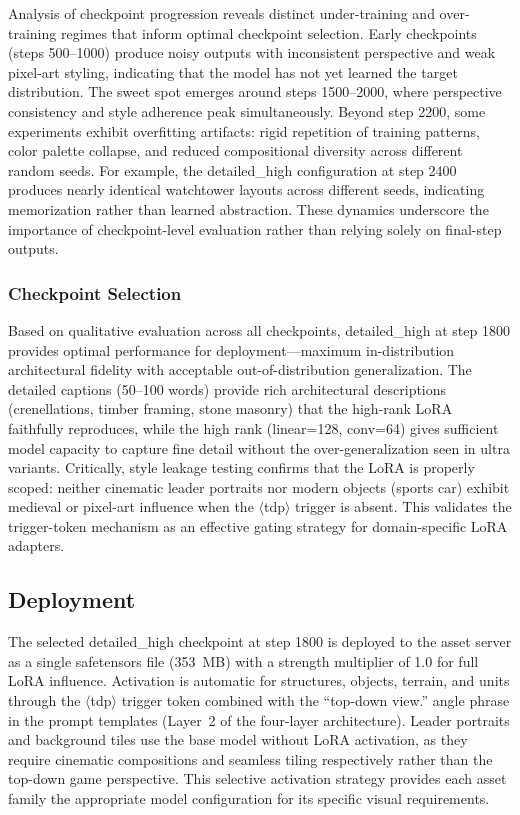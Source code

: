 \documentclass[conference]{IEEEtran}
\begin{document}
Analysis of checkpoint progression reveals distinct under-training and over-training regimes that inform optimal checkpoint selection. Early checkpoints (steps 500--1000) produce noisy outputs with inconsistent perspective and weak pixel-art styling, indicating that the model has not yet learned the target distribution. The sweet spot emerges around steps 1500--2000, where perspective consistency and style adherence peak simultaneously. Beyond step 2200, some experiments exhibit overfitting artifacts: rigid repetition of training patterns, color palette collapse, and reduced compositional diversity across different random seeds. For example, the detailed\_high configuration at step 2400 produces nearly identical watchtower layouts across different seeds, indicating memorization rather than learned abstraction. These dynamics underscore the importance of checkpoint-level evaluation rather than relying solely on final-step outputs.

\subsubsection{Checkpoint Selection}

Based on qualitative evaluation across all checkpoints, detailed\_high at step 1800 provides optimal performance for deployment---maximum in-distribution architectural fidelity with acceptable out-of-distribution generalization. The detailed captions (50--100 words) provide rich architectural descriptions (crenellations, timber framing, stone masonry) that the high-rank LoRA faithfully reproduces, while the high rank (linear=128, conv=64) gives sufficient model capacity to capture fine detail without the over-generalization seen in ultra variants. Critically, style leakage testing confirms that the LoRA is properly scoped: neither cinematic leader portraits nor modern objects (sports car) exhibit medieval or pixel-art influence when the $\langle$tdp$\rangle$ trigger is absent. This validates the trigger-token mechanism as an effective gating strategy for domain-specific LoRA adapters.

\subsection{Deployment}

The selected detailed\_high checkpoint at step 1800 is deployed to the asset server as a single safetensors file (353~MB) with a strength multiplier of 1.0 for full LoRA influence. Activation is automatic for structures, objects, terrain, and units through the $\langle$tdp$\rangle$ trigger token combined with the ``top-down view.'' angle phrase in the prompt templates (Layer~2 of the four-layer architecture). Leader portraits and background tiles use the base model without LoRA activation, as they require cinematic compositions and seamless tiling respectively rather than the top-down game perspective. This selective activation strategy provides each asset family the appropriate model configuration for its specific visual requirements.
\end{document}
